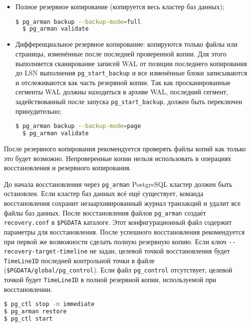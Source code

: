 \begin{itemize}
  \item Полное резервное копирование (копируется весь кластер баз данных);
  \begin{lstlisting}[language=Bash,label=lst:pgarman2,caption=backup]
  $ pg_arman backup --backup-mode=full
  $ pg_arman validate
  \end{lstlisting}
  \item Дифференциальное резервное копирование: копируются только файлы или страницы, изменённые после последней проверенной копии. Для этого выполняется сканирование записей WAL от позиции последнего копирования до LSN выполнения \lstinline!pg_start_backup! и все изменённые блоки записываются и отслеживаются как часть резервной копии. Так как просканированные сегменты WAL должны находиться в архиве WAL, последний сегмент, задействованный после запуска \lstinline!pg_start_backup!, должен быть переключен принудительно;
  \begin{lstlisting}[language=Bash,label=lst:pgarman3,caption=backup]
  $ pg_arman backup --backup-mode=page
  $ pg_arman validate
  \end{lstlisting}
\end{itemize}

После резервного копирования рекомендуется проверять файлы копий как только это будет возможно. Непроверенные копии нельзя использовать в операциях восстановления и резервного копирования.

До начала восстановления через \lstinline!pg_arman! PostgreSQL кластер должен быть остановлен. Если кластер баз данных всё ещё существует, команда восстановления сохранит незаархивированный журнал транзакций и удалит все файлы баз данных. После восстановления файлов \lstinline!pg_arman! создаёт \lstinline!recovery.conf! в \lstinline!$PGDATA! каталоге. Этот конфигурационный файл содержит параметры для восстановления. После успешного восстановления рекомендуется при первой же возможности сделать полную резервную копию. Если ключ \lstinline!--recovery-target-timeline! не задан, целевой точкой восстановления будет \lstinline!TimeLineID! последней контрольной точки в файле (\lstinline!$PGDATA/global/pg_control!). Если файл \lstinline!pg_control! отсутствует, целевой точкой будет \lstinline!TimeLineID! в полной резервной копии, используемой при восстановлении.

\begin{lstlisting}[language=Bash,label=lst:pgarman4,caption=restore]
$ pg_ctl stop -m immediate
$ pg_arman restore
$ pg_ctl start
\end{lstlisting}

